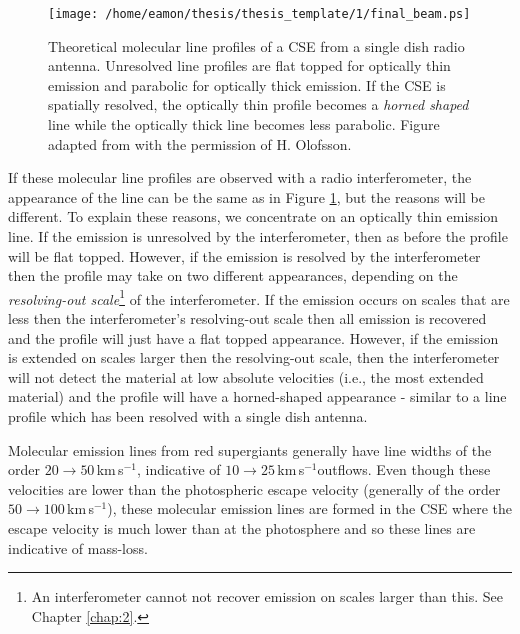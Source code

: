 \begin{figure}[hbt!]
\centering 
          \texttt{[image: /home/eamon/thesis/thesis\_template/1/final\_beam.ps]}
\caption[Theoretical molecular line profiles]{Theoretical molecular line profiles of a CSE from a single dish radio antenna. Unresolved line profiles are flat topped for optically thin emission and parabolic for optically thick emission. If the CSE is spatially resolved, the optically thin profile becomes a \textit{horned shaped} line while the optically thick line becomes less parabolic. Figure adapted from \cite{dalgarno_1987} with the permission of H. Olofsson.}
\label{fig:1.8.5}
\end{figure}

If these molecular line profiles are observed with a radio interferometer, the appearance of the line can be the same as in Figure \ref{fig:1.8.5}, but the reasons will be different. To explain these reasons, we concentrate on an optically thin emission line. If the emission is unresolved by the interferometer, then as before the profile will be flat topped. However, if the emission is resolved by the interferometer then the profile may take on two different appearances, depending on the \textit{resolving-out scale}\footnote{ An interferometer cannot not recover emission on scales larger than this. See Chapter \ref{chap:2}.} of the interferometer. If the emission occurs on scales that are less then the interferometer's resolving-out scale then all emission is recovered and the profile will just have a flat topped appearance. However, if the emission is extended on scales larger then the resolving-out scale, then the interferometer will not detect the material at low absolute velocities (i.e., the most extended material) and the profile will have a horned-shaped appearance - similar to a line profile which has been resolved with a single dish antenna.

Molecular emission lines from red supergiants generally have line widths of the order $20\rightarrow 50$\,km\,s$^{-1}$, indicative of $10 \rightarrow 25$\,km\,s$^{-1} $outflows. Even though these velocities are lower than the photospheric escape velocity (generally of the order $50\rightarrow 100$\,km\,s$^{-1}$), these molecular emission lines are formed in the CSE where the escape velocity is much lower than at the photosphere and so these lines are indicative of mass-loss.


